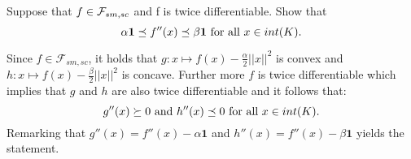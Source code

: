 \begin{exercise}[]{}
	Suppose that $ f \in \mathcal{F}_{sm,sc} $ and f is twice differentiable. Show that 
\begin{equation*}
	\alpha \mathbf{1}\preceq f''(x) \preceq \beta \mathbf{1} \text{ for all $ x\in int(K). $} 
\end{equation*}

\end{exercise}

\begin{solution}[]
	Since $f \in \mathcal{F}_{sm,sc}$, it holds that $g:x \mapsto f(x) - \frac{\alpha}{2}||x||^2$ is convex and $h:x \mapsto f(x)- \frac{\beta}{2}||x||^2$ is concave.
	Further more $f$ is twice differentiable which implies that $g$ and $h$ are also twice differentiable and it follows that:
	\begin{equation*}
		g''(x) \succeq 0\text{ and }  h''(x) \preceq 0  \text{ for all $ x\in int(K). $}
	\end{equation*}
	Remarking that $g''(x) = f''(x) - \alpha\mathbf{1}$ and $h''(x) = f''(x) - \beta \mathbf{1}$ yields the statement.
\end{solution}
